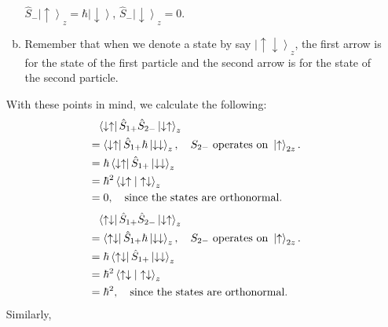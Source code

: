 \documentclass[12pt]{article}
\begin{document}
\begin{enumerate}[1.]
\begin{enumerate}[a.]
              $\hat{S}_{-} \left | \uparrow \right \rangle _z = \hbar \left | \downarrow \right \rangle$, \phantom{Hello!} $\hat{S}_{-} \left | \downarrow \right \rangle _z = 0$.
              \item Remember that when we denote a state by say $\left | \uparrow \downarrow \right \rangle _z$, the first arrow is for the state of the first particle and the second arrow is for the state of the second particle.
       \end{enumerate}
       With these points in mind, we calculate the following:
       $$
       \begin{aligned}
             & \hphantom{=} \left \langle \downarrow \uparrow \right | \hat{S}_{1+} \hat{S}_{2-} \left | \downarrow \uparrow \right \rangle _z  \\
              & = \left \langle \downarrow \uparrow \right | \hat{S}_{1+} \hbar \left | \downarrow \downarrow \right \rangle _z , \quad S_{2-}\mbox{ operates on }\left|\uparrow \right \rangle _{2z}. \\
              &= \hbar \left \langle \downarrow \uparrow \right | \hat{S}_{1+} \left | \downarrow \downarrow \right \rangle _z  \\
              & = \hbar^2 \left \langle \downarrow \uparrow \vphantom{.}\right  | \left. \uparrow \downarrow \right \rangle _z  \\
              & = 0, \quad \mbox{since the states are orthonormal.}
        \end{aligned}
       $$
       $$
       \begin{aligned}
             & \hphantom{=} \left \langle \uparrow \downarrow \right | \hat{S}_{1+} \hat{S}_{2-} \left | \downarrow \uparrow \right \rangle _z  \\
              & = \left \langle \uparrow \downarrow \right | \hat{S}_{1+} \hbar \left | \downarrow \downarrow \right \rangle _z , \quad S_{2-}\mbox{ operates on }\left|\uparrow \right \rangle _{2z}. \\
              &= \hbar \left \langle \uparrow \downarrow \right | \hat{S}_{1+} \left | \downarrow \downarrow \right \rangle _z  \\
              & = \hbar^2 \left \langle \uparrow \downarrow \vphantom{.}\right  | \left. \uparrow \downarrow \right \rangle _z  \\
              & = \hbar ^2, \quad \mbox{since the states are orthonormal.}
        \end{aligned}
       $$
       Similarly, 
       $$
       \begin{aligned}

\end{aligned}$$
\end{enumerate}
\end{document}
